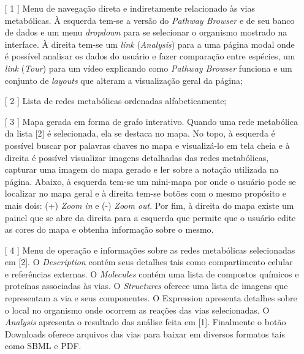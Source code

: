 \begin{itemize}
\item[[ 1]] Menu de navegação direta e indiretamente relacionado às vias metabólicas. À esquerda tem-se a versão do \textit{Pathway Browser} e de seu banco de dados e um menu \textit{dropdown} para se selecionar o organismo mostrado na interface. À direita tem-se um \textit{link} (\textit{Analysis}) para a uma página modal onde é possível analisar os dados do usuário e fazer comparação entre espécies, um \textit{link} (\textit{Tour}) para um vídeo explicando como \textit{Pathway Browser} funciona e um conjunto de \textit{layouts} que alteram a visualização geral da página;
\item[[ 2]] Lista de redes metabólicas ordenadas alfabeticamente;
\item[[ 3]] Mapa gerada em forma de grafo interativo. Quando uma rede metabólica da lista [2] é selecionada, ela se destaca no mapa. No topo, à esquerda é possível buscar por palavras chaves no mapa e visualizá-lo em tela cheia e à direita é possível visualizar imagens detalhadas das redes metabólicas, capturar uma imagem do mapa gerado e ler sobre a notação utilizada na página. Abaixo, à esquerda tem-se um mini-mapa por onde o usuário pode se localizar no mapa geral e à direita tem-se botões com o mesmo propósito e mais dois: (+) \textit{Zoom in} e (-) \textit{Zoom out}. Por fim, à direita do mapa existe um painel que se abre da direita para a esquerda que permite que o usuário edite as cores do mapa e obtenha informação sobre o mesmo.
\item[[ 4]] Menu de operação e informações sobre as redes metabólicas selecionadas em [2]. O \textit{Description} contém seus detalhes tais como compartimento celular e referências externas. O \textit{Molecules} contém uma lista de compostos químicos e proteínas associadas às vias. O \textit{Structures} oferece uma lista de imagens que representam a via e seus componentes. O Expression apresenta detalhes sobre o local no organismo onde ocorrem as reações das vias selecionadas. O \textit{Analysis} apresenta o resultado das análise feita em [1]. Finalmente o botão Downloads oferece arquivos das vias para baixar em diversos formatos tais como SBML e PDF. 
\end{itemize}
\textbf{ }\\


